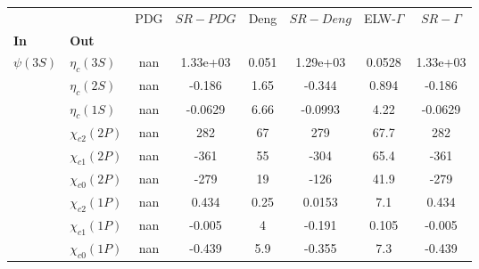 \begin{tabular}{l|l|c|c|c|c|c|c}
\toprule
           &                 &  PDG &  $SR-PDG$ &  Deng &  $SR-Deng$ &  ELW-$\Gamma$ &  $SR-\Gamma$ \\
\textbf{In} & \textbf{Out} &      &           &       &            &               &              \\
\midrule
\textbf{$\psi(3S)$} & \textbf{$\eta_{c}(3S)$} &  nan &  1.33e+03 & 0.051 &   1.29e+03 &        0.0528 &     1.33e+03 \\
           & \textbf{$\eta_{c}(2S)$} &  nan &    -0.186 &  1.65 &     -0.344 &         0.894 &       -0.186 \\
           & \textbf{$\eta_{c}(1S)$} &  nan &   -0.0629 &  6.66 &    -0.0993 &          4.22 &      -0.0629 \\
           & \textbf{$\chi_{c2}(2P)$} &  nan &       282 &    67 &        279 &          67.7 &          282 \\
           & \textbf{$\chi_{c1}(2P)$} &  nan &      -361 &    55 &       -304 &          65.4 &         -361 \\
           & \textbf{$\chi_{c0}(2P)$} &  nan &      -279 &    19 &       -126 &          41.9 &         -279 \\
           & \textbf{$\chi_{c2}(1P)$} &  nan &     0.434 &  0.25 &     0.0153 &           7.1 &        0.434 \\
           & \textbf{$\chi_{c1}(1P)$} &  nan &    -0.005 &     4 &     -0.191 &         0.105 &       -0.005 \\
           & \textbf{$\chi_{c0}(1P)$} &  nan &    -0.439 &   5.9 &     -0.355 &           7.3 &       -0.439 \\
\bottomrule
\end{tabular}
